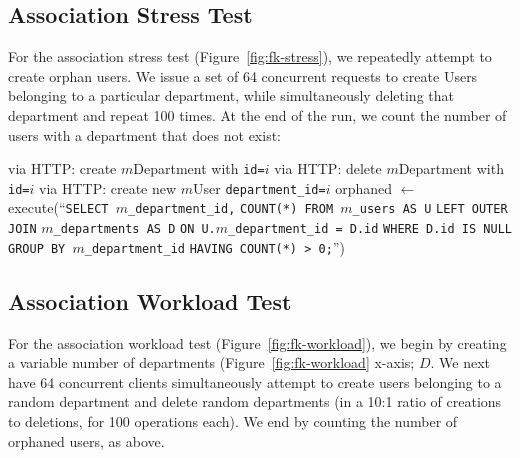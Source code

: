 \subsection{Association Stress Test}
\label{sec:appendix-association-stress}

For the association stress test (Figure~\ref{fig:fk-stress}), we repeatedly attempt to create orphan users. We issue a set of 64 concurrent requests to create Users belonging to a particular department, while simultaneously deleting that department and repeat 100 times. At the end of the run, we count the number of users with a department that does not exist:

\begin{algorithm}[H]
\begin{algorithmic}
    \State via HTTP: create $m$Department with \texttt{id=$i$}
  \EndFor
        \State via HTTP: delete $m$Department with \texttt{id=$i$}
      \Else
        \State via HTTP: create new $m$User \texttt{department\_id=$i$}
      \EndIf        
     \EndParFor
   \EndFor
   \State orphaned $\gets $execute(``\texttt{SELECT $m$\_department\_id,}
   \State \hspace{8.5em}\texttt{COUNT(*) FROM $m$\_users AS U}
   \State \hspace{8.5em}\texttt{LEFT OUTER JOIN}
   \State \hspace{8.5em}\texttt{$m$\_departments AS D}
   \State \hspace{8.5em}\texttt{ON U.$m$\_department\_id = D.id}
   \State \hspace{8.5em}\texttt{WHERE D.id IS NULL}
   \State \hspace{8.5em}\texttt{GROUP BY $m$\_department\_id}
   \State \hspace{8.5em}\texttt{HAVING COUNT(*) > 0;}'')
\EndFor
\end{algorithmic}
\end{algorithm}

\subsection{Association Workload Test}
\label{sec:appendix-association-workload}

For the association workload test (Figure~\ref{fig:fk-workload}), we begin by creating a variable number of departments (Figure~\ref{fig:fk-workload} x-axis; $D$. We next have 64 concurrent clients simultaneously attempt to create users belonging to a random department and delete random departments (in a 10:1 ratio of creations to deletions, for 100 operations each). We end by counting the number of orphaned users, as above.

